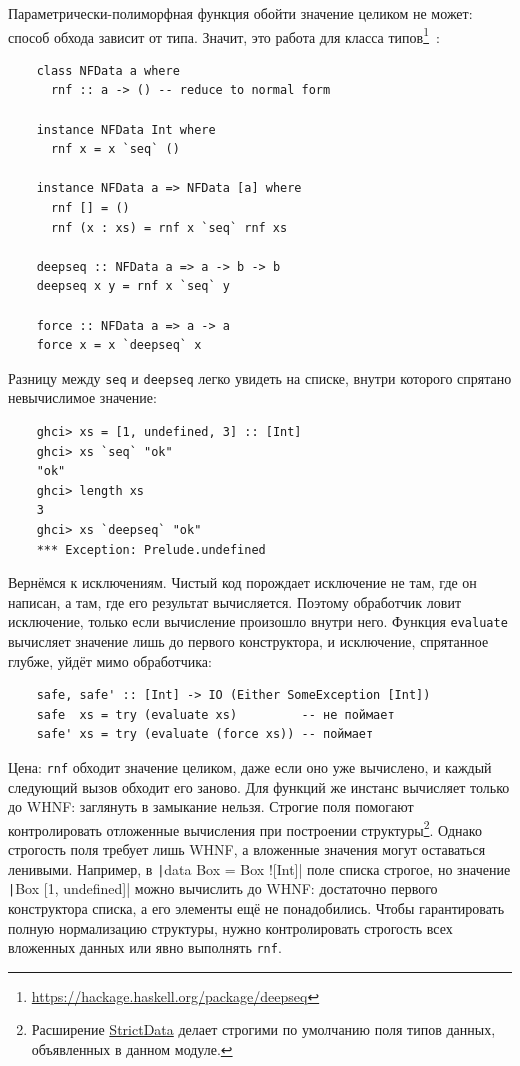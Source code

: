 Параметрически-полиморфная функция обойти значение целиком не может: способ обхода зависит от типа.
Значит, это работа для класса типов\footnote{\url{https://hackage.haskell.org/package/deepseq}}~\cite[глава 2]{marlow2011parallel}:
\begin{verbatim}
    class NFData a where
      rnf :: a -> () -- reduce to normal form

    instance NFData Int where
      rnf x = x `seq` ()

    instance NFData a => NFData [a] where
      rnf [] = ()
      rnf (x : xs) = rnf x `seq` rnf xs

    deepseq :: NFData a => a -> b -> b
    deepseq x y = rnf x `seq` y

    force :: NFData a => a -> a
    force x = x `deepseq` x
\end{verbatim}

Разницу между \texttt{seq} и \texttt{deepseq} легко увидеть на списке, внутри которого спрятано невычислимое значение:
\begin{verbatim}
    ghci> xs = [1, undefined, 3] :: [Int]
    ghci> xs `seq` "ok"
    "ok"
    ghci> length xs
    3
    ghci> xs `deepseq` "ok"
    *** Exception: Prelude.undefined
\end{verbatim}

Вернёмся к исключениям.
Чистый код порождает исключение не там, где он написан, а там, где его результат вычисляется.
Поэтому обработчик ловит исключение, только если вычисление произошло внутри него.
Функция \texttt{evaluate} вычисляет значение лишь до первого конструктора, и исключение, спрятанное глубже, уйдёт мимо обработчика:
\begin{verbatim}
    safe, safe' :: [Int] -> IO (Either SomeException [Int])
    safe  xs = try (evaluate xs)         -- не поймает
    safe' xs = try (evaluate (force xs)) -- поймает
\end{verbatim}

Цена: \texttt{rnf} обходит значение целиком, даже если оно уже вычислено, и каждый следующий вызов обходит его заново.
Для функций же инстанс вычисляет только до WHNF: заглянуть в замыкание нельзя.
Строгие поля помогают контролировать отложенные вычисления при построении структуры\footnote{Расширение \href{https://downloads.haskell.org/ghc/latest/docs/users_guide/exts/strict.html}{StrictData} делает строгими по умолчанию поля типов данных, объявленных в данном модуле.}.
Однако строгость поля требует лишь WHNF, а вложенные значения могут оставаться ленивыми.
Например, в \texttt|data Box = Box ![Int]| поле списка строгое, но значение \texttt|Box [1, undefined]| можно вычислить до WHNF: достаточно первого конструктора списка, а его элементы ещё не понадобились.
Чтобы гарантировать полную нормализацию структуры, нужно контролировать строгость всех вложенных данных или явно выполнять \texttt{rnf}.

